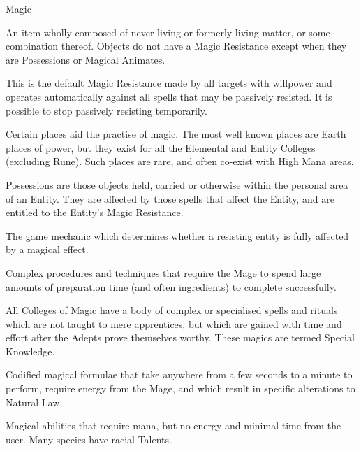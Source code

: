 \begin{Chapter}{Magic}
\begin{Description}
\item[Object] An item wholly composed of never living or formerly
  living matter, or some combination thereof.  Objects do not have a
  Magic Resistance except when they are Possessions or Magical
  Animates.

\item[Passive Resistance] This is the default Magic Resistance made by
  all targets with willpower and operates automatically against all
  spells that may be passively resisted.  It is possible to stop
  passively resisting temporarily.

\item[Place of Power] Certain places aid the practise of magic.  The
  most well known places are Earth places of power, but they exist for
  all the Elemental and Entity Colleges (excluding Rune). Such places
  are rare, and often co-exist with High Mana areas.

\item[Possessions] Possessions are those objects held, carried or
  otherwise within the personal area of an Entity. They are affected
  by those spells that affect the Entity, and are entitled to the
  Entity’s Magic Resistance.

\item[Resistance Check] The game mechanic which determines whether a
  resisting entity is fully affected by a magical effect.

\item[Ritual Magic] Complex procedures and techniques that require the
  Mage to spend large amounts of preparation time (and often
  ingredients) to complete successfully.

\item[Special Knowledge] All Colleges of Magic have a body of complex
  or specialised spells and rituals which are not taught to mere
  apprentices, but which are gained with time and effort after the
  Adepts prove themselves worthy. These magics are termed Special
  Knowledge.

\item[Spell Magic] Codified magical formulae that take anywhere from a
  few seconds to a minute to perform, require energy from the Mage,
  and which result in specific alterations to Natural Law.

\item[Talent Magic] Magical abilities that require mana, but no energy
  and minimal time from the user.  Many species have racial Talents.

\end{Description}


\end{Chapter}
